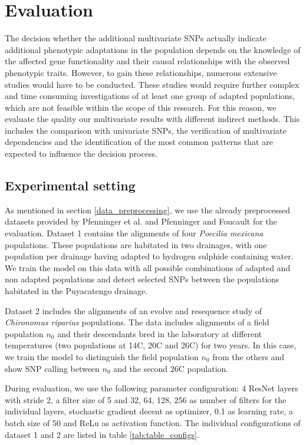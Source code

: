 \documentclass{article}
\begin{document}
\section{Evaluation}
The decision whether the additional multivariate SNPs actually indicate additional phenotypic adaptations in the population depends on the knowledge of the affected gene functionality and their causal relationships with the observed phenotypic traits. However, to gain these relationships, numerous extensive studies would have to be conducted. These studies would require further complex and time consuming investigations of at least one group of adapted populations, which are not feasible within the scope of this research. 
For this reason, we evaluate the quality our multivariate results with different indirect methods. This includes the comparison with univariate SNPs, the verification of multivariate dependencies and the identification of the most common patterns that are expected to influence the decision process.
\label{evaluation}
\subsection{Experimental setting}
As mentioned in section \ref{data_preprocessing}, we use the already preprocessed datasets provided by Pfenninger et al. \cite{pfenninger_poecilia} and Pfenninger and Foucault \cite{pfenninger_foucault} for the evaluation.
Dataset 1 contains the alignments of four {\em Poecilia mexicana} populations. These populations are habitated in two drainages, with one population per drainage having adapted to hydrogen sulphide containing water. We train the model on this data with all possible combinations of adapted and non adapted populations and detect selected SNPs between the populations habitated in the Puyacatengo drainage.

Dataset 2 includes the alignments of an evolve and resequence study of {\em Chironomus riparius} populations. The data includes alignments of a field population $n_{0}$ and their descendants bred in the laboratory at different temperatures (two populations at 14\degree C, 20\degree C and 26\degree C) for two years. In this case, we train the model to distinguish the field population $n_{0}$ from the others and show SNP calling between $n_{0}$ and the second 26\degree C population.

During evaluation, we use the following parameter configuration:
4 ResNet layers with stride 2, a filter size of 5 and 32, 64, 128, 256 as number of filters for the individual layers, stochastic gradient decent as optimizer, 0.1 as learning rate, a batch size of 50 and ReLu as activation function. The individual configurations of dataset 1 and 2 are listed in table \ref{tab:table_configs}.
\end{document}
